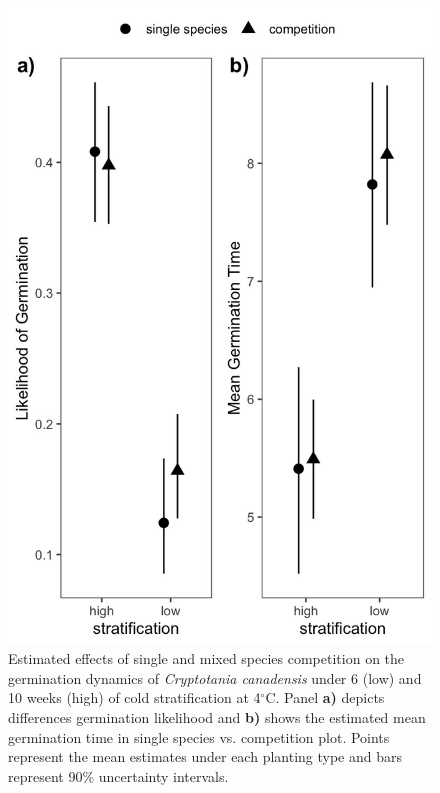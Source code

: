 \documentclass{article}[11pt]
\begin{document}
\begin{figure}[h!]
    \centering
\includegraphics[width=.7\textwidth]{..//figure/nichemodfication.jpeg}
   \caption{Estimated effects of single and mixed species competition on the germination dynamics of \textit{Cryptotania canadensis} under 6 (low) and 10 weeks (high) of cold stratification at 4$^{\circ}$C. Panel \textbf{a)} depicts differences germination likelihood and \textbf{b)} shows the estimated mean germination time in single species vs. competition plot. Points represent the mean estimates under each planting type and bars represent 90\% uncertainty intervals. } 
   \label{fig:nichemod}
\end{figure}
\end{document}
